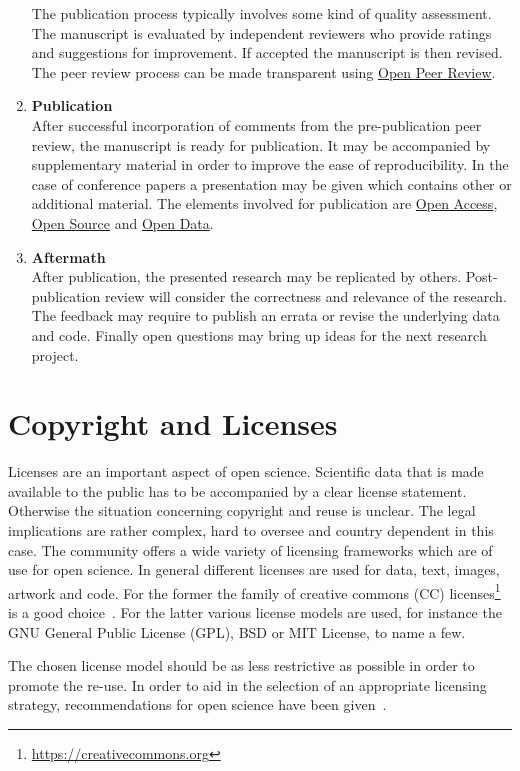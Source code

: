 \documentclass[a4paper, 10pt, twocolumn]{article}
\begin{document}
\begin{enumerate}
The publication process typically involves some kind of quality assessment. The manuscript is evaluated by
independent reviewers who provide ratings and suggestions for improvement. If accepted the manuscript is
then revised. The peer review process can be made transparent using \underline{Open Peer Review}.
%
\item \textbf{Publication}\\
After successful incorporation of comments from the pre-publication peer review, the manuscript is ready for
publication. It may be accompanied by supplementary material in order to improve the ease of reproducibility. In the
case of conference papers a presentation may be given which contains other or additional material. The elements involved
for publication are \underline{Open Access}, \underline{Open Source} and \underline{Open Data}.
%
\item \textbf{Aftermath}\\
After publication, the presented research may be replicated by others. Post-publication
review will consider the correctness and relevance of the research. The feedback may 
require to publish an errata or revise the underlying data and code. Finally open 
questions may bring up ideas for the next research project.
\end{enumerate}


\section*{Copyright and Licenses} \label{sec:copyright}

Licenses are an important aspect of open science. Scientific data that is made 
available to the public has to be accompanied by a clear license statement. Otherwise
the situation concerning copyright and reuse is unclear. The legal implications are
rather complex, hard to oversee and country dependent in this case. The community offers
a wide variety of licensing frameworks which are of use for open science. In general different 
licenses are used for data, text, images, artwork and code. For the former the family of 
creative commons (CC) licenses\footnote{\url{https://creativecommons.org}} is a good 
choice~\cite{Kreuzer14:Book}. For the latter various license models are used, for instance 
the GNU General Public License (GPL), BSD or MIT License, to name a few.

The chosen license model should be as less restrictive as possible in order to promote the
re-use. In order to aid in the selection of an appropriate licensing strategy, recommendations
for open science have been given~\cite{Stodden09:CSE}.
\end{document}
